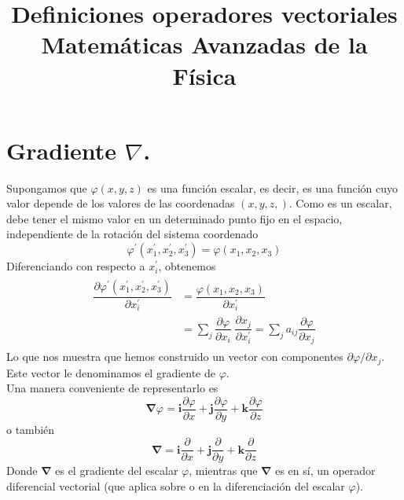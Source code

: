 
\usepackage{standalone}
\usepackage{tikz,tikz-3dplot}
\title{Definiciones operadores vectoriales \\ {\large Matemáticas Avanzadas de la Física}}
\date{ }

\renewcommand\labelenumii{\theenumi.{\arabic{enumii}}}
\maketitle
\fontsize{14}{14}\selectfont
\section{Gradiente $\nabla$.}
Supongamos que $\varphi(x,y,z)$ es una función escalar, es decir, es una función cuyo valor depende de los valores de las coordenadas $(x,y,z,)$. Como es un escalar, debe tener el mismo valor en un determinado punto fijo en el espacio, independiente de la rotación del sistema coordenado
\begin{equation}
\varphi^{\prime} (x_{1}^{\prime},x_{2}^{\prime},x_{3}^{\prime}) = \varphi(x_{1},x_{2},x_{3})
\label{eq:ecuacion_01_51}
\end{equation}
Diferenciando con respecto a $x_{i}^{\prime}$, obtenemos
\begin{eqnarray}
\begin{aligned}
\dfrac{\partial \varphi^{\prime} (x_{1}^{\prime},x_{2}^{\prime},x_{3}^{\prime})}{\partial x_{i}^{\prime}} &= \dfrac{\varphi(x_{1},x_{2},x_{3})}{\partial x_{i}^{\prime}} \\
&= \sum_{j} \dfrac{\partial \varphi}{\partial x_{i}} \; \dfrac{\partial x_{j}}{\partial x_{i}^{\prime}} = \sum_{j} a_{ij} \dfrac{\partial \varphi}{\partial x_{j}}
\end{aligned}
\label{eq:ecuacion_01_52}
\end{eqnarray}
Lo que nos muestra que hemos construido un vector con componentes $\partial \varphi / \partial x_{j}$. Este vector le denominamos el gradiente de $\varphi$.
\\
Una manera conveniente de representarlo es
\begin{equation}
\bm{\nabla} \varphi = \mathbf{i} \dfrac{\partial \varphi}{\partial x} + \mathbf{j} \dfrac{\partial \varphi}{\partial y} + \mathbf{k} \dfrac{\partial \varphi}{\partial z}
\label{eq:ecuacion_01_53}
\end{equation}
o también
\begin{equation}
\bm{\nabla} = \mathbf{i} \dfrac{\partial}{\partial x} + \mathbf{j} \dfrac{\partial}{\partial y} + \mathbf{k} \dfrac{\partial}{\partial z}
\label{eq:ecuacion_01_54}
\end{equation}
Donde $\bm{\nabla}$ es el gradiente del escalar $\varphi$, mientras que $\bm{\nabla}$ es en sí, un operador diferencial vectorial (que aplica sobre o en la diferenciación del escalar $\varphi$).
